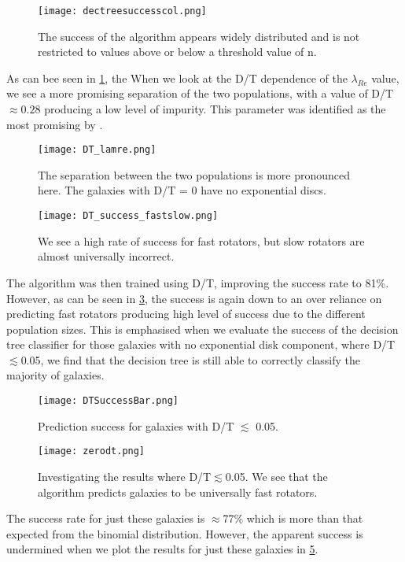 \begin{figure}[h!]
	\centering
	\texttt{[image: dectreesuccesscol.png]}
	\caption{The success of the algorithm appears widely distributed and is not restricted to values above or below a threshold value of n.
	}
	\label{fig:nsuccess}
\end{figure}
As can bee seen in \ref{fig:nsuccess}, the 
When we look at the D/T dependence of the $\lambda_{Re}$ value, we see a more promising separation of the two populations, with a value of D/T $\approx 0.28$ producing a low level of impurity. This parameter was identified as the most promising by \cite{Krajnovic2013}.
\begin{figure}[ht]
	\centering
	\texttt{[image: DT\_lamre.png]}
	\caption{The separation between the two populations is more pronounced here. The galaxies with D/T = 0 have no exponential discs.
	}
	\label{fig:dtlamre}
\end{figure}
\begin{figure}[ht]
	\centering
	\texttt{[image: DT\_success\_fastslow.png]}
	\caption{We see a high rate of success for fast rotators, but slow rotators are almost universally incorrect.
	}
	\label{fig:dtfastslow}
\end{figure}
The algorithm was then trained using D/T, improving the success rate to 81\%. However, as can be seen in \ref{fig:dtfastslow}, the success is again down to an over reliance on predicting fast rotators producing high level of success due to the different population sizes.
This is emphasised when we evaluate the success of the decision tree classifier for those galaxies with no exponential disk component, where D/T$\lesssim $0.05, we find that the decision tree is still able to correctly classify the majority of galaxies.
\begin{figure}[h!]
	\centering
	\texttt{[image: DTSuccessBar.png]}
	\caption{Prediction success for galaxies with D/T $\lesssim$ 0.05.}
	\label{fig:dtbar}
\end{figure}
\begin{figure}[h!]
	\centering
	\texttt{[image: zerodt.png]}
	\caption{Investigating the results where D/T$\lesssim $0.05. We see that the algorithm predicts galaxies to be universally fast rotators.
	}
	\label{fig:zerodt}
\end{figure}
The success rate for just these galaxies is $\approx$77\% which is more than that expected from the binomial distribution. However, the apparent success is undermined when we plot the results for just these galaxies in \ref{fig:zerodt}.
